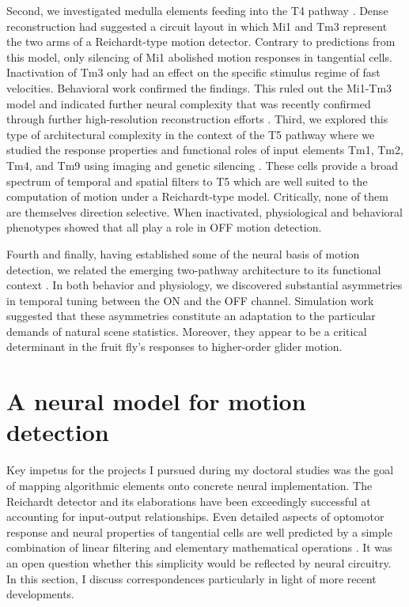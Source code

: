 Second, we investigated medulla elements feeding into the T4 pathway \citep{Ammer:2015jo}. Dense reconstruction had suggested a circuit layout in which Mi1 and Tm3 represent the two arms of a Reichardt-type motion detector. Contrary to predictions from this model, only silencing of Mi1 abolished motion responses in tangential cells. Inactivation of Tm3 only had an effect on the specific stimulus regime of fast velocities. Behavioral work confirmed the findings. This ruled out the Mi1-Tm3 model and indicated further neural complexity that was recently confirmed through further high-resolution reconstruction efforts \citep{Takemura:2017aa}. Third, we explored this type of architectural complexity in the context of the T5 pathway where we studied the response properties and functional roles of input elements Tm1, Tm2, Tm4, and Tm9 using imaging and genetic silencing \citep{Serbe:2016ew}. These cells provide a broad spectrum of temporal and spatial filters to T5 which are well suited to the computation of motion under a Reichardt-type model. Critically, none of them are themselves direction selective. When inactivated, physiological and behavioral phenotypes showed that all play a role in OFF motion detection. 

Fourth and finally, having established some of the neural basis of motion detection, we related the emerging two-pathway architecture to its functional context \citep{Leonhardt:2016ex}. In both behavior and physiology, we discovered substantial asymmetries in temporal tuning between the ON and the OFF channel. Simulation work suggested that these asymmetries constitute an adaptation to the particular demands of natural scene statistics. Moreover, they appear to be a critical determinant in the fruit fly's responses to higher-order glider motion.

\section{A neural model for motion detection}
Key impetus for the projects I pursued during my doctoral studies was the goal of mapping algorithmic elements onto concrete neural implementation. The Reichardt detector and its elaborations have been exceedingly successful at accounting for input-output relationships. Even detailed aspects of optomotor response and neural properties of tangential cells are well predicted by a simple combination of linear filtering and elementary mathematical operations \citep{Borst:1989vp,Borst:2002iw}. It was an open question whether this simplicity would be reflected by neural circuitry. In this section, I discuss correspondences particularly in light of more recent developments.

